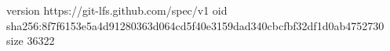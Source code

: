 version https://git-lfs.github.com/spec/v1
oid sha256:8f7f6153e5a4d91280363d064cd5f40e3159dad340cbcfbf32df1d0ab4752730
size 36322

